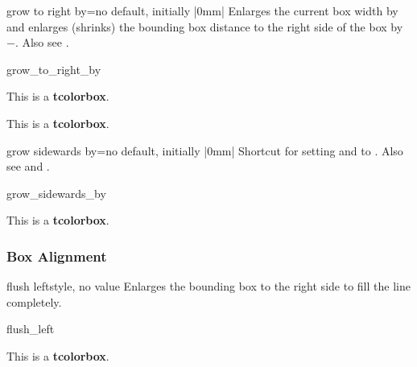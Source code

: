 \begin{docTcbKey}{grow to right by}{=}{no default, initially |0mm|}
  Enlarges the current box width by  and
  enlarges (shrinks) the bounding box distance to the right side of the box by
  $-$. Also see .
\begin{exdispExample}[safety=2cm]{grow_to_right_by}

\begin{tcolorbox}[grow to right by=2cm,enhanced,show bounding box]
This is a \textbf{tcolorbox}.
\end{tcolorbox}

\bigskip

\begin{tcolorbox}[grow to right by=2cm,grow to left by=1cm,
  enhanced,show bounding box]
This is a \textbf{tcolorbox}.
\end{tcolorbox}
\end{exdispExample}
\end{docTcbKey}

\clearpage

\begin{docTcbKey}[][doc new=2018-03-22]{grow sidewards by}{=}{no default, initially |0mm|}
  Shortcut for setting  and 
  to . Also see  and .
\begin{exdispExample}[safety=2cm]{grow_sidewards_by}

\begin{tcolorbox}[grow sidewards by=2cm,enhanced,show bounding box]
This is a \textbf{tcolorbox}.
\end{tcolorbox}
\end{exdispExample}
\end{docTcbKey}


\subsubsection{Box Alignment}

\begin{docTcbKey}[][doc new=2015-11-20]{flush left}{}{style, no value}
  Enlarges the bounding box to the right side to fill the line completely.
\begin{exdispExample}{flush_left}

\begin{tcolorbox}[flush left,width=5cm,enhanced,show bounding box]
This is a \textbf{tcolorbox}.
\end{tcolorbox}
\end{exdispExample}
\end{docTcbKey}


